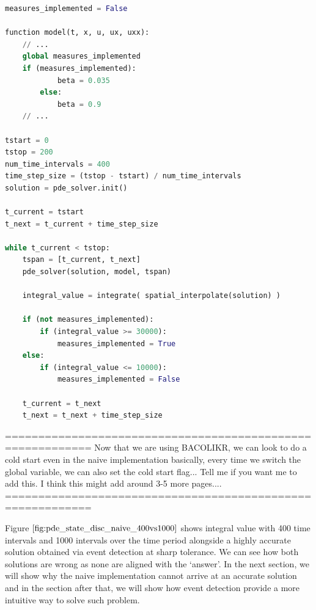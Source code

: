 \documentclass{article}
\begin{document}
\begin{minipage}{\linewidth}
\begin{lstlisting}[language=Python]
measures_implemented = False

function model(t, x, u, ux, uxx):
    // ...
    global measures_implemented
    if (measures_implemented):
    		beta = 0.035
    	else:
    		beta = 0.9
    // ...

tstart = 0
tstop = 200
num_time_intervals = 400
time_step_size = (tstop - tstart) / num_time_intervals
solution = pde_solver.init()

t_current = tstart
t_next = t_current + time_step_size

while t_current < tstop:
	tspan = [t_current, t_next]
	pde_solver(solution, model, tspan)
	
	integral_value = integrate( spatial_interpolate(solution) )
	
	if (not measures_implemented):
		if (integral_value >= 30000):
			measures_implemented = True
	else:
		if (integral_value <= 10000):
			measures_implemented = False
	
	t_current = t_next
	t_next = t_next + time_step_size
\end{lstlisting}
\end{minipage} 

===========================================================
Now that we are using BACOLIKR, we can look to do a cold start even in the naive implementation
basically, every time we switch the global variable, we can also set the cold start flag...
Tell me if you want me to add this. I think this might add around 3-5 more pages.... 
===========================================================

Figure $\ref{fig:pde_state_disc_naive_400vs1000}$ shows integral value with 400 time intervals and 1000 intervals over the time period alongside a highly accurate solution obtained via event detection at sharp tolerance. We can see how both solutions are wrong as none are aligned with the `answer'. In the next section, we will show why the naive implementation cannot arrive at an accurate solution and in the section after that, we will show how event detection provide a more intuitive way to solve such problem.
\end{document}

